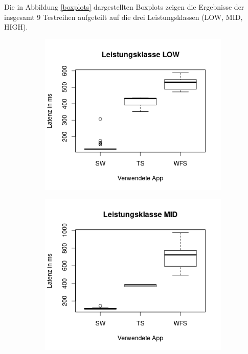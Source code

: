 Die in Abbildung \ref{boxplots} dargestellten Boxplots zeigen die Ergebnisse der insgesamt 9 Testreihen aufgeteilt auf die drei Leistungsklassen (LOW, MID, HIGH).


\begin{figure}[h!]
\begin{subfigure}[b]{0.5\textwidth}
\includegraphics[width=\textwidth]{img/boxplotlow.png}
\end{subfigure}
\begin{subfigure}[b]{0.5\textwidth}
\includegraphics[width=\textwidth]{img/boxplotmid.png}

\end{subfigure}
\end{figure}
